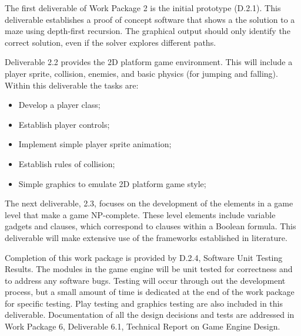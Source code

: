 \documentclass[a4paper]{article}
\begin{document}
The first deliverable of Work Package 2 is the initial prototype (D.2.1). This deliverable
establishes a proof of concept software that shows a the solution to a maze using depth-first
recursion. The graphical output should only identify the correct solution, even if the solver
explores different paths.

Deliverable 2.2 provides the 2D platform game environment. This will include a player sprite,
collision, enemies, and basic physics (for jumping and falling). Within this deliverable the tasks are:

\begin{itemize}

  \item Develop a player class;
  \item Establish player controls;
  \item Implement simple player sprite animation;
  \item Establish rules of collision;
  \item Simple graphics to emulate 2D platform game style;

\end{itemize}

The next deliverable, 2.3, focuses on the development of the elements in a game level that make a
game NP-complete. These level elements include variable gadgets and clauses, which correspond to
clauses within a Boolean formula. This deliverable will make extensive use of the frameworks
established in literature.

Completion of this work package is provided by D.2.4, Software Unit Testing Results. The modules in
the game engine will be unit tested for correctness and to address any software bugs. Testing will
occur through out the development process, but a small amount of time is dedicated at the end of the
work package for specific testing. Play testing and graphics testing are also included in this
deliverable.  Documentation of all the design decisions and tests are addressed in Work Package 6,
Deliverable 6.1, Technical Report on Game Engine Design.




\end{document}
